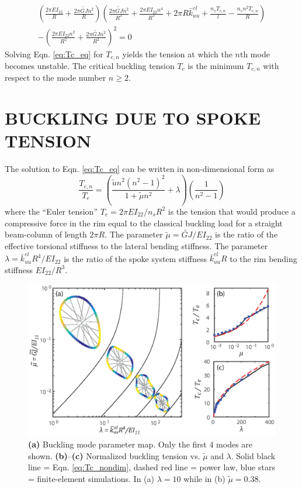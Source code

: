 \documentclass{bmd2016p}
\begin{document}
	\begin{multline}\label{eq:Tc_eq}
	\left(\frac{2\pi EI_{22}}{R}+\frac{2\pi \widetilde{GJ}n^2}{R} \right) \left( \frac{2\pi \widetilde{GJ}n^2}{R^3} + \frac{2\pi EI_{22}n^4}{R^3} + 2\pi R\bar{k}_{uu}^{el} + \frac{n_sT_{c,n}}{l} - \frac{n_sn^2T_{c,n}}{R}\right)\\
	- \left( \frac{2\pi EI_{22}n^2}{R^2} + \frac{2\pi \widetilde{GJ}n^2}{R^2} \right)^2 = 0
	\end{multline}
Solving Eqn. \ref{eq:Tc_eq} for $T_{c,n}$ yields the tension at which the $n$th mode becomes unstable. The critical buckling tension $T_c$ is the minimum $T_{c,n}$ with respect to the mode number $n\geq 2$.



\section{BUCKLING DUE TO SPOKE TENSION}
The solution to Eqn. \ref{eq:Tc_eq} can be written in non-dimensional form as
	\begin{equation}\label{eq:Tc_nondim}
	\frac{T_{c,n}}{T_e} = \left( \frac{\tilde{u}n^2(n^2-1)^2}{1+\tilde{\mu}n^2} + \lambda \right) \left(\frac{1}{n^2-1} \right)
	\end{equation}
where the ``Euler tension'' $T_e=2\pi EI_{22}/n_sR^2$ is the tension that would produce a compressive force in the rim equal to the classical buckling load for a straight beam-column of length $2\pi R$. The parameter $\tilde{\mu} = \widetilde{GJ}/EI_{22}$ is the ratio of the effective torsional stiffness to the lateral bending stiffness. The parameter $\lambda = \bar{k}_{uu}^{el}R^4/EI_{22}$ is the ratio of the spoke system stiffness $\bar{k}_{uu}^{el}R$ to the rim bending stiffness $EI_{22}/R^3$.

\begin{figure}[!ht]
\centering
\includegraphics[scale=1.0]{figures/bmd_figures-04.eps}
\caption{\textbf{(a)} Buckling mode parameter map. Only the first 4 modes are shown. \textbf{(b)}--\textbf{(c)} Normalized buckling tension vs. $\tilde{\mu}$ and $\lambda$. Solid black line = Eqn. \ref{eq:Tc_nondim}, dashed red line = power law, blue stars = finite-element simulations. In (a) $\lambda=10$ while in (b) $\tilde{\mu} = 0.38$.}
\label{fig:Tc_nondim}
\end{figure}
\end{document}
